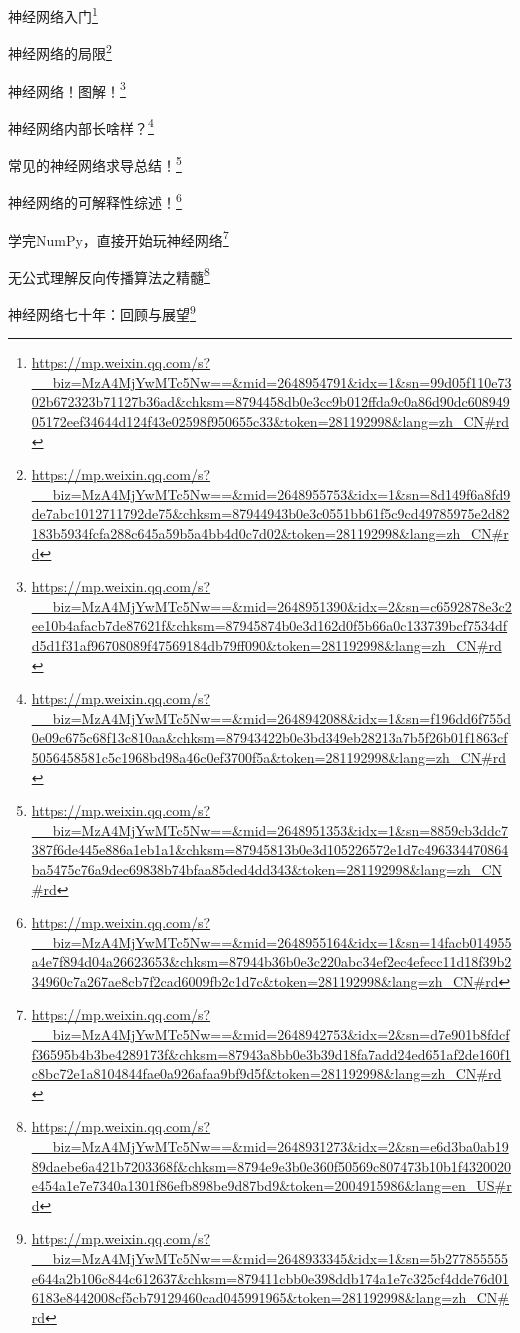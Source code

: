 \documentclass[]{ctexbook}
\renewcommand{\href}[2]{#2\footnote{\url{#1}}}
\begin{document}
\href{https://mp.weixin.qq.com/s?__biz=MzA4MjYwMTc5Nw==\&mid=2648954791\&idx=1\&sn=99d05f110e7302b672323b71127b36ad\&chksm=8794458db0e3cc9b012ffda9c0a86d90dc60894905172eef34644d124f43e02598f950655c33\&token=281192998\&lang=zh_CN\#rd}{神经网络入门}

\href{https://mp.weixin.qq.com/s?__biz=MzA4MjYwMTc5Nw==\&mid=2648955753\&idx=1\&sn=8d149f6a8fd9de7abc1012711792de75\&chksm=87944943b0e3c0551bb61f5c9cd49785975e2d82183b5934fcfa288c645a59b5a4bb4d0c7d02\&token=281192998\&lang=zh_CN\#rd}{神经网络的局限}

\href{https://mp.weixin.qq.com/s?__biz=MzA4MjYwMTc5Nw==\&mid=2648951390\&idx=2\&sn=c6592878e3c2ee10b4afacb7de87621f\&chksm=87945874b0e3d162d0f5b66a0c133739bcf7534dfd5d1f31af96708089f47569184db79ff090\&token=281192998\&lang=zh_CN\#rd}{神经网络！图解！}

\href{https://mp.weixin.qq.com/s?__biz=MzA4MjYwMTc5Nw==\&mid=2648942088\&idx=1\&sn=f196dd6f755d0e09c675c68f13c810aa\&chksm=87943422b0e3bd349eb28213a7b5f26b01f1863cf5056458581c5c1968bd98a46c0ef3700f5a\&token=281192998\&lang=zh_CN\#rd}{神经网络内部长啥样？}

\href{https://mp.weixin.qq.com/s?__biz=MzA4MjYwMTc5Nw==\&mid=2648951353\&idx=1\&sn=8859cb3ddc7387f6de445e886a1eb1a1\&chksm=87945813b0e3d105226572e1d7c496334470864ba5475c76a9dec69838b74bfaa85ded4dd343\&token=281192998\&lang=zh_CN\#rd}{常见的神经网络求导总结！}

\href{https://mp.weixin.qq.com/s?__biz=MzA4MjYwMTc5Nw==\&mid=2648955164\&idx=1\&sn=14facb014955a4e7f894d04a26623653\&chksm=87944b36b0e3c220abc34ef2ec4efecc11d18f39b234960c7a267ae8cb7f2cad6009fb2c1d7c\&token=281192998\&lang=zh_CN\#rd}{神经网络的可解释性综述！}

\href{https://mp.weixin.qq.com/s?__biz=MzA4MjYwMTc5Nw==\&mid=2648942753\&idx=2\&sn=d7e901b8fdcff36595b4b3be4289173f\&chksm=87943a8bb0e3b39d18fa7add24ed651af2de160f1c8bc72e1a8104844fae0a926afaa9bf9d5f\&token=281192998\&lang=zh_CN\#rd}{学完NumPy，直接开始玩神经网络}

\href{https://mp.weixin.qq.com/s?__biz=MzA4MjYwMTc5Nw==\&mid=2648931273\&idx=2\&sn=e6d3ba0ab1989daebe6a421b7203368f\&chksm=8794e9e3b0e360f50569c807473b10b1f4320020e454a1e7e7340a1301f86efb898be9d87bd9\&token=2004915986\&lang=en_US\#rd}{无公式理解反向传播算法之精髓}

\href{https://mp.weixin.qq.com/s?__biz=MzA4MjYwMTc5Nw==\&mid=2648933345\&idx=1\&sn=5b277855555e644a2b106c844c612637\&chksm=879411cbb0e398ddb174a1e7c325cf4dde76d016183e8442008cf5cb79129460cad045991965\&token=281192998\&lang=zh_CN\#rd}{神经网络七十年：回顾与展望}
\end{document}
